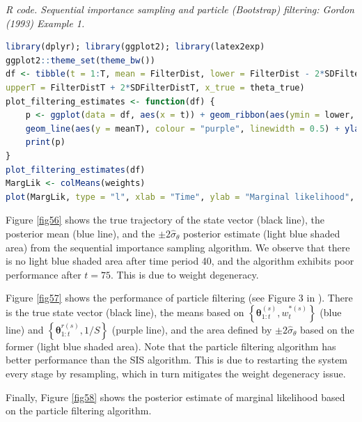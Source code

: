 \begin{enumerate}[leftmargin=*]
\begin{tcolorbox}[enhanced,width=4.67in,center upper,
	fontupper=\large\bfseries,drop shadow southwest,sharp corners]
	\textit{R code. Sequential importance sampling and particle (Bootstrap) filtering: Gordon (1993) Example 1.}
	\begin{VF}
		\begin{lstlisting}[language=R]
library(dplyr); library(ggplot2); library(latex2exp)
ggplot2::theme_set(theme_bw())
df <- tibble(t = 1:T, mean = FilterDist, lower = FilterDist - 2*SDFilterDist, upper = FilterDist+ 2*SDFilterDist, meanT = FilterDistT, lowerT = FilterDistT - 2*SDFilterDistT,
upperT = FilterDistT + 2*SDFilterDistT, x_true = theta_true)
plot_filtering_estimates <- function(df) {
	p <- ggplot(data = df, aes(x = t)) + geom_ribbon(aes(ymin = lower, ymax = upper), alpha = 1, fill = "lightblue") + geom_line(aes(y = x_true), colour = "black", alpha = 1, linewidth = 0.5) + geom_line(aes(y = mean), colour = "blue", linewidth = 0.5) +
	geom_line(aes(y = meanT), colour = "purple", linewidth = 0.5) + ylab(TeX("$\\theta_{t}$")) + xlab("Time")
	print(p)
}
plot_filtering_estimates(df)
MargLik <- colMeans(weights)
plot(MargLik, type = "l", xlab = "Time", ylab = "Marginal likelihood", main = "Marginal likelihood")
\end{lstlisting}
	\end{VF}
\end{tcolorbox} 
Figure \ref{fig56} shows the true trajectory of the state vector (black line), the posterior mean (blue line), and the $\pm2\hat{\sigma}_{\theta}$ posterior estimate (light blue shaded area) from the sequential importance sampling algorithm. We observe that there is no light blue shaded area after time period 40, and the algorithm exhibits poor performance after $t=75$. This is due to weight degeneracy.

Figure \ref{fig57} shows the performance of particle filtering (see Figure 3 in \cite{Gordon1993}). There is the true state vector (black line), the means based on $\left\{\bm{\theta}_{1:t}^{(s)},w_t^{*(s)}\right\}$ (blue line) and  $\left\{\bm{\theta}_{1:t}^{r(s)},1/S\right\}$ (purple line), and the area defined by $\pm2\hat{\sigma}_{\theta}$ based on the former (light blue shaded area). Note that the particle filtering algorithm has better performance than the SIS algorithm. This is due to restarting the system every stage by resampling, which in turn mitigates the weight degeneracy issue.

Finally, Figure \ref{fig58} shows the posterior estimate of marginal likelihood based on the particle filtering algorithm.


\end{enumerate}
